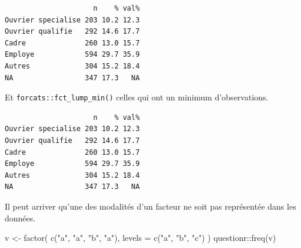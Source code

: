 \documentclass[
  letterpaper,
  DIV=11,
  numbers=noendperiod,
  oneside]{scrreprt}
\newenvironment{Shaded}{\begin{snugshade}}{\end{snugshade}}
\newcommand{\AttributeTok}[1]{\textcolor[rgb]{0.40,0.45,0.13}{#1}}
\newcommand{\DecValTok}[1]{\textcolor[rgb]{0.68,0.00,0.00}{#1}}
\newcommand{\FunctionTok}[1]{\textcolor[rgb]{0.28,0.35,0.67}{#1}}
\newcommand{\NormalTok}[1]{\textcolor[rgb]{0.00,0.23,0.31}{#1}}
\newcommand{\OtherTok}[1]{\textcolor[rgb]{0.00,0.23,0.31}{#1}}
\newcommand{\SpecialCharTok}[1]{\textcolor[rgb]{0.37,0.37,0.37}{#1}}
\newcommand{\StringTok}[1]{\textcolor[rgb]{0.13,0.47,0.30}{#1}}
\begin{document}
\begin{Shaded}
\end{Shaded}

\begin{verbatim}
                     n    % val%
Ouvrier specialise 203 10.2 12.3
Ouvrier qualifie   292 14.6 17.7
Cadre              260 13.0 15.7
Employe            594 29.7 35.9
Autres             304 15.2 18.4
NA                 347 17.3   NA
\end{verbatim}

Et \texttt{forcats::fct\_lump\_min()} celles qui ont un minimum
d'observations.

\begin{Shaded}
\end{Shaded}

\begin{verbatim}
                     n    % val%
Ouvrier specialise 203 10.2 12.3
Ouvrier qualifie   292 14.6 17.7
Cadre              260 13.0 15.7
Employe            594 29.7 35.9
Autres             304 15.2 18.4
NA                 347 17.3   NA
\end{verbatim}

Il peut arriver qu'une des modalités d'un facteur ne soit pas
représentée dans les données.

\begin{Shaded}
\begin{Highlighting}[]
\NormalTok{v }\OtherTok{\textless{}{-}} \FunctionTok{factor}\NormalTok{(}
  \FunctionTok{c}\NormalTok{(}\StringTok{"a"}\NormalTok{, }\StringTok{"a"}\NormalTok{, }\StringTok{"b"}\NormalTok{, }\StringTok{"a"}\NormalTok{),}
  \AttributeTok{levels =} \FunctionTok{c}\NormalTok{(}\StringTok{"a"}\NormalTok{, }\StringTok{"b"}\NormalTok{, }\StringTok{"c"}\NormalTok{)}
\NormalTok{)}
\NormalTok{questionr}\SpecialCharTok{::}\FunctionTok{freq}\NormalTok{(v)}
\end{Highlighting}
\end{Shaded}
\end{document}
